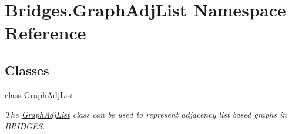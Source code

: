 \hypertarget{namespace_bridges_1_1_graph_adj_list}{}\section{Bridges.\+Graph\+Adj\+List Namespace Reference}
\label{namespace_bridges_1_1_graph_adj_list}
\subsection*{Classes}
\begin{DoxyCompactItemize}
\item 
class \mbox{\hyperlink{class_bridges_1_1_graph_adj_list_1_1_graph_adj_list}{Graph\+Adj\+List}}
\begin{DoxyCompactList}\small\item\em The \mbox{\hyperlink{class_bridges_1_1_graph_adj_list_1_1_graph_adj_list}{Graph\+Adj\+List}} class can be used to represent adjacency list based graphs in B\+R\+I\+D\+G\+ES. \end{DoxyCompactList}\end{DoxyCompactItemize}
